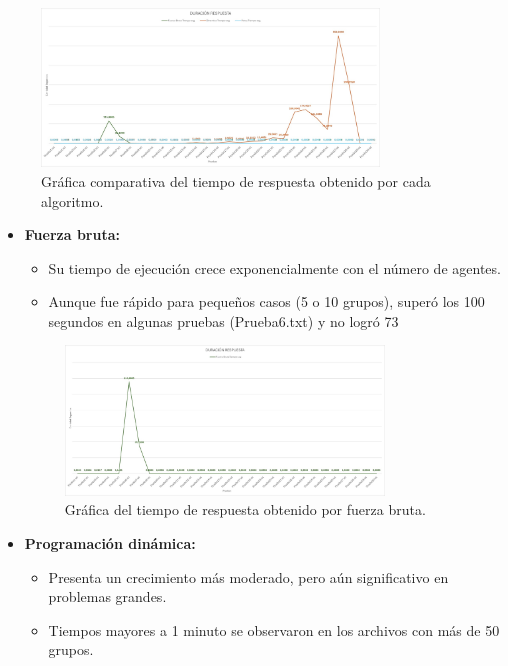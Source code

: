 \documentclass[11pt,letter]{article}
\begin{document}
    \begin{figure}[H]
        \centering
        \includegraphics[width=0.8\textwidth]{resources/tiempo1.jpeg}
        \caption{Gráfica comparativa del tiempo de respuesta obtenido por cada algoritmo.}
    \end{figure}

    \begin{itemize}
        \item \textbf{Fuerza bruta:}
        \begin{itemize}
            \item Su tiempo de ejecución crece exponencialmente con el número de agentes.
            \item Aunque fue rápido para pequeños casos (5 o 10 grupos), superó los 100 segundos en algunas pruebas (Prueba6.txt) y no logró 73%
        \end{itemize}
        \begin{figure}[H]
            \centering
            \includegraphics[width=0.8\textwidth]{resources/tiempo2.jpeg}
            \caption{Gráfica del tiempo de respuesta obtenido por fuerza bruta.}
        \end{figure}
        \item \textbf{Programación dinámica:}
        \begin{itemize}
            \item Presenta un crecimiento más moderado, pero aún significativo en problemas grandes.
            \item Tiempos mayores a 1 minuto se observaron en los archivos con más de 50 grupos.

\end{itemize}
\end{itemize}
\end{document}
